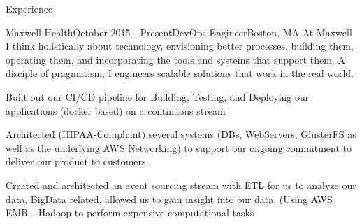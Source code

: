 \documentclass{resume} %
\begin{document}
\begin{rSection}{Experience}

\begin{rSubsection}{Maxwell Health}{October 2015 - Present}{DevOps Engineer}{Boston, MA}
At Maxwell I think holistically about technology, envisioning better processes, building them, operating them, and incorporating the tools and systems that support them. A disciple of pragmatism, I engineers scalable solutions that work in the real world.
\item Built out our CI/CD pipeline for Building, Testing, and Deploying our applications (docker based) on a continuous stream
\item Architected (HIPAA-Compliant) several systems (DBs, WebServers, GlusterFS as well as the underlying AWS Networking) to support our ongoing commitment to deliver our product to customers.
\item Created and architected an event sourcing stream with ETL for us to analyze our data, BigData related, allowed us to gain insight into our data. (Using AWS EMR - Hadoop to perform expensive computational tasks
\end{rSubsection}




\end{rSection}
\end{document}
